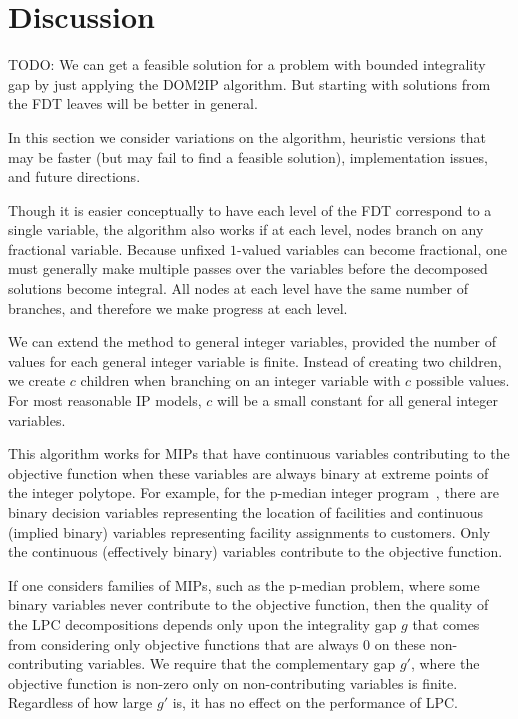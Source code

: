 \documentclass[11pt]{article}
\begin{document}
\section{Discussion}
\label{sec:future}

TODO: We can get a feasible solution for a problem with bounded integrality gap by
just applying the DOM2IP algorithm.  But starting with solutions from the FDT leaves
will be better in general.

In this section we consider variations on the algorithm, heuristic versions that
may be faster (but may fail to find a feasible solution), implementation issues,
and future directions.

Though it is easier conceptually to have each level of the FDT correspond to a
single variable, the algorithm also works if at each level, nodes branch on
any fractional variable.  Because unfixed $1$-valued variables can become fractional,
one must generally make multiple passes over the variables before the decomposed solutions
become integral.  All nodes at each level have the same number of branches, and therefore
we make progress at each level.

We can extend the method to general integer variables, provided the number
of values for each general integer variable is finite.  Instead of creating
two children, we create $c$ children when branching on an integer variable
with $c$ possible values.  For most reasonable IP models, $c$ will be a small
constant for all general integer variables.

This algorithm works for MIPs that have continuous variables contributing to the
objective function when these variables are always binary at extreme points of the
integer polytope.  For example, for the p-median integer program~\cite{MF90}, there are binary
decision variables representing the location of facilities and continuous (implied
binary) variables representing facility assignments to customers.  Only the
continuous (effectively binary) variables contribute to the objective function.

If one considers families of MIPs, such as the p-median problem, where some binary
variables never contribute to the objective function, then the quality of the LPC
decompositions depends only upon the integrality gap $g$ that comes from considering
only objective functions that are always $0$ on these non-contributing variables.
We require that the complementary gap $g'$, where the objective function is non-zero
only on non-contributing variables is finite.  Regardless of how large $g'$ is, it
has no effect on the performance of LPC.
\end{document}
